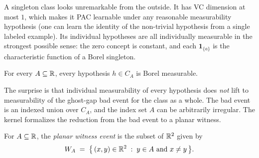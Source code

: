 A singleton class looks unremarkable from the outside. It has VC
dimension at most $1$, which makes it PAC learnable under any
reasonable measurability hypothesis (one can learn the identity of
the non-trivial hypothesis from a single labeled example). Its
individual hypotheses are all individually measurable in the strongest
possible sense: the zero concept is constant, and each
$\mathbf{1}_{\{a\}}$ is the characteristic function of a Borel
singleton.

\begin{lemma}
\label{lem:singleton-class-measurable}
  \leanok
For every $A \subseteq \mathbb{R}$, every hypothesis $h \in C_A$ is Borel
measurable.
\end{lemma}

The surprise is that individual measurability of every hypothesis
does \emph{not} lift to measurability of the ghost-gap bad event
for the class as a whole. The bad event is an indexed union over
$C_A$, and the index set $A$ can be arbitrarily irregular. The
kernel formalizes the reduction from the bad event to a planar
witness.

\begin{defn}
\label{def:planar-witness}
  \leanok
For $A \subseteq \mathbb{R}$, the \emph{planar witness event} is the subset
of $\mathbb{R}^2$ given by
\[
  W_A \;=\; \bigl\{\,(x, y) \in \R^2 \;:\; y \in A\ \text{and}\ x \neq y\,\bigr\}.
\]
\end{defn}

